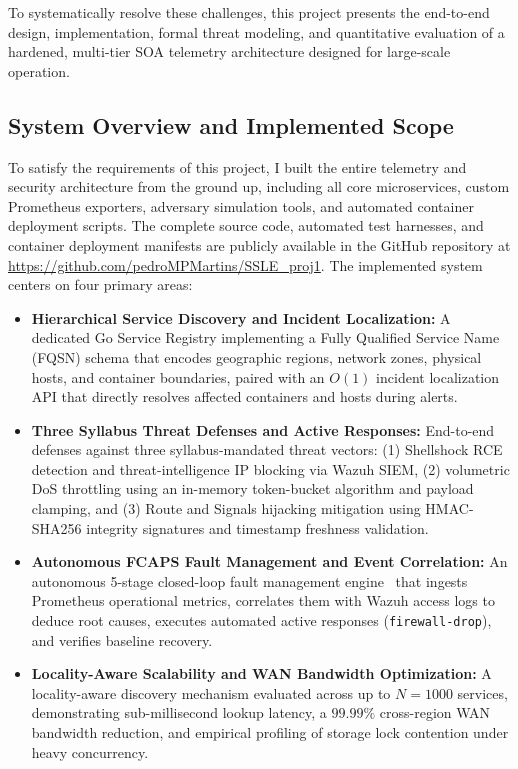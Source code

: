 To systematically resolve these challenges, this project presents the end-to-end design, implementation, formal threat modeling, and quantitative evaluation of a hardened, multi-tier SOA telemetry architecture designed for large-scale operation. 

\subsection{System Overview and Implemented Scope}
To satisfy the requirements of this project, I built the entire telemetry and security architecture from the ground up, including all core microservices, custom Prometheus exporters, adversary simulation tools, and automated container deployment scripts. The complete source code, automated test harnesses, and container deployment manifests are publicly available in the GitHub repository at \url{https://github.com/pedroMPMartins/SSLE_proj1}. The implemented system centers on four primary areas:
\begin{itemize}
    \item \textbf{Hierarchical Service Discovery and Incident Localization:} A dedicated Go Service Registry implementing a Fully Qualified Service Name (FQSN) schema that encodes geographic regions, network zones, physical hosts, and container boundaries, paired with an $O(1)$ incident localization API that directly resolves affected containers and hosts during alerts.
    \item \textbf{Three Syllabus Threat Defenses and Active Responses:} End-to-end defenses against three syllabus-mandated threat vectors: (1) Shellshock RCE detection and threat-intelligence IP blocking via Wazuh SIEM, (2) volumetric DoS throttling using an in-memory token-bucket algorithm and payload clamping, and (3) Route and Signals hijacking mitigation using HMAC-SHA256 integrity signatures and timestamp freshness validation.
    \item \textbf{Autonomous FCAPS Fault Management and Event Correlation:} An autonomous 5-stage closed-loop fault management engine~\citep{itu_fcaps} that ingests Prometheus operational metrics, correlates them with Wazuh access logs to deduce root causes, executes automated active responses (\texttt{firewall-drop}), and verifies baseline recovery.
    \item \textbf{Locality-Aware Scalability and WAN Bandwidth Optimization:} A locality-aware discovery mechanism evaluated across up to $N = 1000$ services, demonstrating sub-millisecond lookup latency, a $99.99\%$ cross-region WAN bandwidth reduction, and empirical profiling of storage lock contention under heavy concurrency.
\end{itemize}

